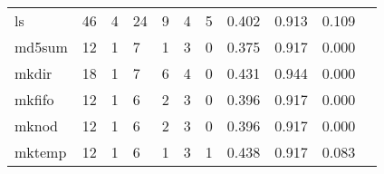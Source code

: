 \begin{longtable}{lp{1.2cm}p{1.2cm}p{1.2cm}p{1.2cm}p{1.2cm}p{1.2cm}p{1.2cm}p{1.2cm}p{1.2cm}p{1.2cm}}
ls        &                                    46 &                                                  4 &                                                 24 &                                                  9 &                                                  4 &                                                  5 &                                              0.402 &                                              0.913 &                                              0.109 \\
md5sum    &                                    12 &                                                  1 &                                                  7 &                                                  1 &                                                  3 &                                                  0 &                                              0.375 &                                              0.917 &                                              0.000 \\
mkdir     &                                    18 &                                                  1 &                                                  7 &                                                  6 &                                                  4 &                                                  0 &                                              0.431 &                                              0.944 &                                              0.000 \\
mkfifo    &                                    12 &                                                  1 &                                                  6 &                                                  2 &                                                  3 &                                                  0 &                                              0.396 &                                              0.917 &                                              0.000 \\
mknod     &                                    12 &                                                  1 &                                                  6 &                                                  2 &                                                  3 &                                                  0 &                                              0.396 &                                              0.917 &                                              0.000 \\
mktemp    &                                    12 &                                                  1 &                                                  6 &                                                  1 &                                                  3 &                                                  1 &                                              0.438 &                                              0.917 &                                              0.083 \\

\end{longtable}
